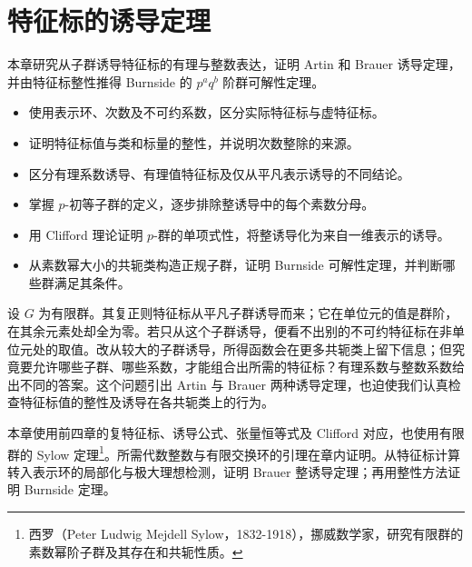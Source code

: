 
\chapter{特征标的诱导定理}
\label{b5:ch:05}

\begin{chapterabstract}
	本章研究从子群诱导特征标的有理与整数表达，证明 Artin 和 Brauer 诱导定理，并由特征标整性推得 Burnside 的 \(p^a q^b\) 阶群可解性定理。
\end{chapterabstract}

\begin{learninggoals}
	\begin{itemize}
		\item 使用表示环、次数及不可约系数，区分实际特征标与虚特征标。
		\item 证明特征标值与类和标量的整性，并说明次数整除的来源。
		\item 区分有理系数诱导、有理值特征标及仅从平凡表示诱导的不同结论。
		\item 掌握 \(p\)-初等子群的定义，逐步排除整诱导中的每个素数分母。
		\item 用 Clifford 理论证明 \(p\)-群的单项式性，将整诱导化为来自一维表示的诱导。
		\item 从素数幂大小的共轭类构造正规子群，证明 Burnside 可解性定理，并判断哪些群满足其条件。
	\end{itemize}
\end{learninggoals}

设 \(G\) 为有限群。其复正则特征标从平凡子群诱导而来；它在单位元的值是群阶，在其余元素处却全为零。若只从这个子群诱导，便看不出别的不可约特征标在非单位元处的取值。改从较大的子群诱导，所得函数会在更多共轭类上留下信息；但究竟要允许哪些子群、哪些系数，才能组合出所需的特征标？有理系数与整数系数给出不同的答案。这个问题引出 Artin 与 Brauer 两种诱导定理，也迫使我们认真检查特征标值的整性及诱导在各共轭类上的行为。

\ProseParagraphBreak
本章使用前四章的复特征标、诱导公式、张量恒等式及 Clifford 对应，也使用有限群的 Sylow 定理\footnote{西罗（Peter Ludwig Mejdell Sylow，1832-1918），挪威数学家，研究有限群的素数幂阶子群及其存在和共轭性质。}。所需代数整数与有限交换环的引理在章内证明。从特征标计算转入表示环的局部化与极大理想检测，证明 Brauer 整诱导定理；再用整性方法证明 Burnside 定理。

